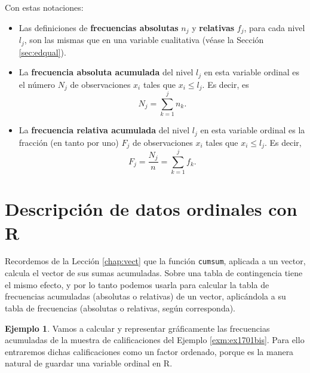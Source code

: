 \documentclass[
]{book}
\theoremstyle{definition}
\theoremstyle{definition}
\newtheorem{example}{Ejemplo}[chapter]
\theoremstyle{definition}
\theoremstyle{remark}
\begin{document}
Con estas notaciones:

\begin{itemize}
\item
  Las definiciones de \textbf{frecuencias absolutas} \(n_j\) y \textbf{relativas} \(f_j\), para cada nivel \(l_j\),
  son las mismas que en una variable cualitativa (véase la Sección \ref{sec:edqual}).
\item
  La \textbf{frecuencia absoluta acumulada} del nivel \(l_j\) en esta variable ordinal es el número \(N_j\) de observaciones \(x_i\) tales que \(x_i\leqslant l_j\). Es decir,
  es
  \[N_j=\sum\limits_{k=1}^j n_k.\]
\item
  La \textbf{frecuencia relativa acumulada} del nivel \(l_j\) en esta variable ordinal es la fracción (en tanto por uno) \(F_j\) de observaciones \(x_i\) tales que \(x_i\leqslant l_j\). Es decir,
  \[
  F_j=\dfrac{N_j}{n}=\sum\limits_{k=1}^j f_k.
  \]
\end{itemize}

\hypertarget{descripciuxf3n-de-datos-ordinales-con-r}{%
\section{Descripción de datos ordinales con R}\label{descripciuxf3n-de-datos-ordinales-con-r}}

Recordemos de la Lección \ref{chap:vect} que la función \texttt{cumsum}, aplicada a un vector, calcula el vector de sus sumas acumuladas. Sobre una tabla de contingencia tiene el mismo efecto, y por lo tanto podemos usarla para calcular la tabla de frecuencias acumuladas (absolutas o relativas) de un vector, aplicándola a su tabla de frecuencias (absolutas o relativas, según corresponda).

\begin{example}
\protect\hypertarget{exm:ex1ordinales}{}{\label{exm:ex1ordinales} }Vamos a calcular y representar gráficamente las frecuencias acumuladas de la muestra de calificaciones del Ejemplo \ref{exm:ex1701bis}. Para ello entraremos dichas calificaciones como un factor ordenado, porque es la manera natural de guardar una variable ordinal en R.
\end{example}
\end{document}

